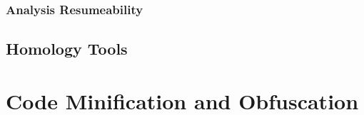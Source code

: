 \subsubsection{Analysis Resumeability}


\subsection{Homology Tools}
\section{Code Minification and Obfuscation}